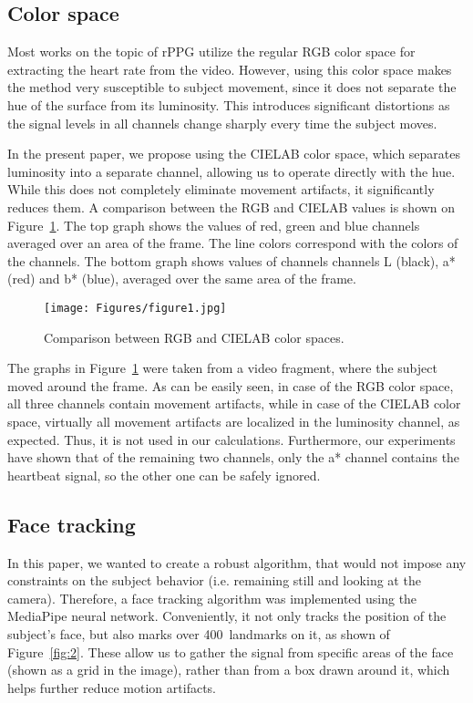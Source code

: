 \subsection{Color space}\label{meth_color_space}

Most works on the topic of rPPG utilize the regular RGB color space for extracting the heart rate from the video. However, using this color space makes the method very susceptible to subject movement, since it does not separate the hue of the surface from its luminosity. This introduces significant distortions as the signal levels in all channels change sharply every time the subject moves.

 In the present paper, we propose using the CIELAB color space, which separates luminosity into a separate channel, allowing us to operate directly with the hue. While this does not completely eliminate movement artifacts, it significantly reduces them. A comparison between the RGB and CIELAB values is shown on Figure~\ref{fig:1}. The top graph shows the values of red, green and blue channels averaged over an area of the frame. The line colors correspond with the colors of the channels. The bottom graph shows values of channels channels L (black), a* (red) and b* (blue), averaged over the same area of the frame.

\begin{figure}[htbp]
    \centering
    \texttt{[image: Figures/figure1.jpg]}
    \caption{Comparison between RGB and CIELAB color spaces.}
    \label{fig:1}
\end{figure}

The graphs in Figure~\ref{fig:1} were taken from a video fragment, where the subject moved around the frame. As can be easily seen, in case of the RGB color space, all three channels contain movement artifacts, while in case of the CIELAB color space, virtually all movement artifacts are localized in the luminosity channel, as expected. Thus, it is not used in our calculations. Furthermore, our experiments have shown that of the remaining two channels, only the a* channel contains the heartbeat signal, so the other one can be safely ignored.

\subsection{Face tracking}\label{meth_face_tracking}

In this paper, we wanted to create a robust algorithm, that would not impose any constraints on the subject behavior (i.e. remaining still and looking at the camera). Therefore, a face tracking algorithm was implemented using the MediaPipe neural network. Conveniently, it not only tracks the position of the subject’s face, but also marks over 400 landmarks on it, as shown of Figure~\ref{fig:2}. These allow us to gather the signal from specific areas of the face (shown as a grid in the image), rather than from a box drawn around it, which helps further reduce motion artifacts.


